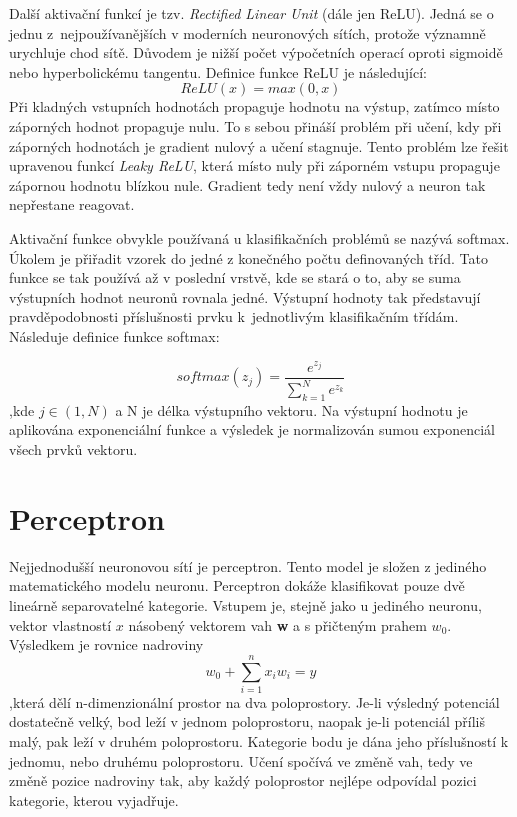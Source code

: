 Další aktivační funkcí je tzv. \emph{Rectified Linear Unit} (dále jen ReLU).
Jedná se o jednu z~nejpoužívanějších v moderních neuronových sítích,
protože významně urychluje chod sítě.
Důvodem je nižší počet výpočetních operací oproti sigmoidě
nebo hyperbolickému tangentu.
Definice funkce ReLU je následující:
\begin{equation}
    ReLU(x) = max(0, x)
\end{equation}
Při kladných vstupních hodnotách propaguje hodnotu na výstup,
zatímco místo záporných hodnot propaguje nulu.
To s sebou přináší problém při učení,
kdy při záporných hodnotách je gradient nulový a učení stagnuje.
Tento problém lze řešit upravenou funkcí \emph{Leaky ReLU},
která místo nuly při záporném vstupu propaguje zápornou hodnotu blízkou nule.
Gradient tedy není vždy nulový a neuron tak nepřestane reagovat.
\cite{Mehrotra_ElementsOfNNs}
\par

Aktivační funkce obvykle používaná u klasifikačních problémů se nazývá softmax.
Úkolem je přiřadit vzorek do jedné z konečného počtu definovaných tříd.
Tato funkce se tak používá až v poslední vrstvě,
kde se stará o to, aby se suma výstupních hodnot neuronů rovnala jedné.
Výstupní hodnoty tak představují pravděpodobnosti příslušnosti prvku
k~jednotlivým klasifikačním třídám.
Následuje definice funkce softmax:

\begin{equation}
    softmax(z_j) = \frac{e^{z_j}}{\sum^{N}_{k=1}e^{z_k}}
\end{equation}
,kde $j \in (1,N)$ a N je délka výstupního vektoru.
Na výstupní hodnotu je aplikována exponenciální funkce
a výsledek je normalizován sumou exponenciál všech prvků vektoru.
\cite{Mehrotra_ElementsOfNNs,Goodfellow-et-al-2016}

\section{Perceptron}
Nejjednodušší neuronovou sítí je perceptron.
Tento model je složen z jediného matematického modelu neuronu.
Perceptron dokáže klasifikovat pouze dvě lineárně separovatelné kategorie.
Vstupem je, stejně jako u jediného neuronu, vektor vlastností $x$
násobený vektorem vah \textbf{w} a s přičteným prahem $ w_0 $.
Výsledkem je rovnice nadroviny
\begin{equation}
    w_0 + \sum_{i=1}^{n} x_{i}w_{i} = y
\end{equation}
,která dělí n-dimenzionální prostor na dva poloprostory.
Je-li výsledný potenciál dostatečně velký, bod leží v jednom poloprostoru,
naopak je-li potenciál příliš malý, pak leží v druhém poloprostoru.
Kategorie bodu je dána jeho příslušností k jednomu, nebo druhému poloprostoru.
Učení spočívá ve změně vah, tedy ve změně pozice nadroviny tak,
aby každý poloprostor nejlépe odpovídal pozici kategorie, 
kterou vyjadřuje. 
\cite{Goodfellow-et-al-2016, Nicholson_Perceptron, Chalupnik_NeuronoveSite}

